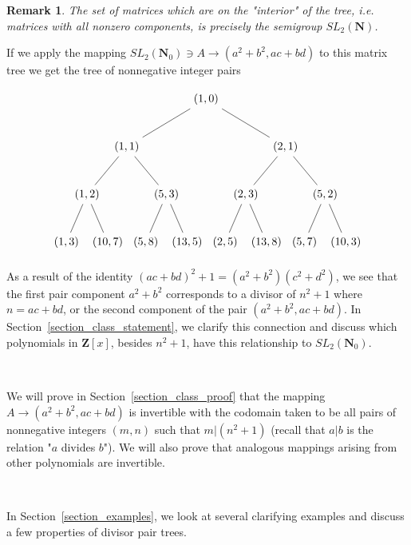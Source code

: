 \documentclass{article}
\newtheorem{remark}[theorem]{Remark}  %
\begin{document}
\begin{remark}\label{remark_interior}
The set of matrices which are on the "interior" of the tree, i.e. matrices with all nonzero components, is precisely the semigroup $SL_2(\mathbf{N})$.
\end{remark}

If we apply the mapping $SL_2(\mathbf{N}_0) \ni A \rightarrow (a^2 + b^2, ac + bd)$ to this matrix tree we get the tree of nonnegative integer pairs

$$
\begin{tikzpicture}[level distance=15mm, 
                    level 1/.style={sibling distance=50mm},
                    level 2/.style={sibling distance=25mm},
                    level 3/.style={sibling distance=13mm}]
  \node {\((1, 0)\)}
    child {
      node {\((1, 1)\)} 
      child {
        node {\((1, 2)\)}
        child {node {\((1, 3)\)}}
        child {node {\((10, 7)\)}}
      }
      child {
        node {\((5, 3)\)}
        child {node {\((5, 8)\)}}
        child {node {\((13, 5)\)}}
      }
    }
    child {
      node {\((2, 1)\)}
      child {
        node {\((2, 3)\)}
        child {node {\((2, 5)\)}}
        child {node {\((13, 8)\)}}
      }
      child {
        node {\((5, 2)\)}
        child {node {\((5, 7)\)}}
        child {node {\((10, 3)\)}}
      } 
    };
\end{tikzpicture}
$$

As a result of the identity $(ac + bd)^2 + 1 = (a^2 + b^2)(c^2 + d^2)$, we see that the first pair component $a^2 + b^2$ corresponds to a divisor of $n^2 + 1$ where $n = ac + bd$, or the second component of the pair $(a^2 + b^2, ac + bd)$. In Section~\ref{section_class_statement}, we clarify this connection and discuss which polynomials in $\mathbf{Z}[x]$, besides $n^2 + 1$, have this relationship to $SL_2(\mathbf{N}_0)$. 

\

We will prove in Section~\ref{section_class_proof} that the mapping $A \rightarrow (a^2 + b^2, ac + bd)$ is invertible with the codomain taken to be all pairs of nonnegative integers $(m, n)$ such that $m \lvert (n^2 + 1)$ (recall that $a \lvert b$ is the relation "$a$ divides $b$"). We will also prove that analogous mappings arising from other polynomials are invertible. 

\

In Section~\ref{section_examples}, we look at several clarifying examples and discuss a few properties of divisor pair trees.

\
\end{document}
